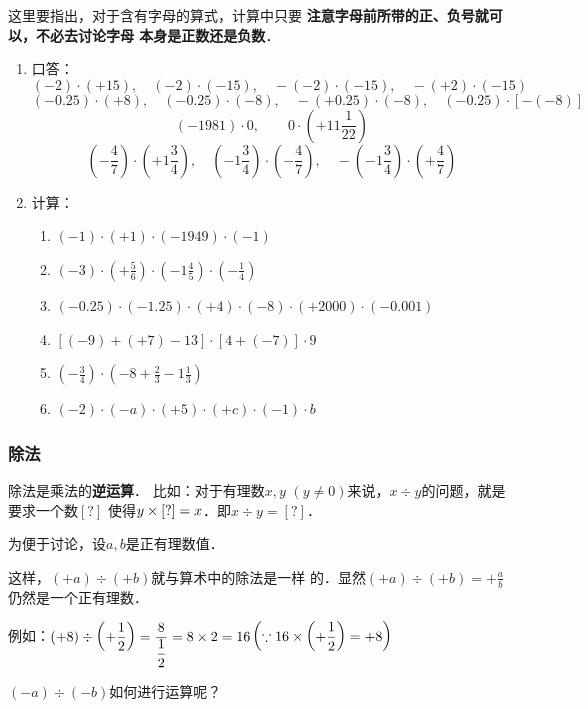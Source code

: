这里要指出，对于含有字母的算式，计算中只要
\textbf{注意字母前所带的正、负号就可以，不必去讨论字母
本身是正数还是负数}．

\begin{ex}
	\begin{enumerate}
		\item 口答：
		\[(-2)\cdot (+15),\quad (-2)\cdot (-15),\quad -(-2)\cdot (-15),\quad -(+2)\cdot (-15)\]
		\[(-0.25)\cdot (+8),\quad (-0.25)\cdot (-8),\quad -(+0.25)\cdot (-8),\quad(-0.25)\cdot [-(-8)] \]
		\[(-1981)\cdot 0,\qquad 0\cdot\left(+11\frac{1}{22}\right)\]
		\[\left(-\frac{4}{7}\right)\cdot \left(+1\frac{3}{4}\right),\quad \left(-1\frac{3}{4}\right)\cdot\left(-\frac{4}{7}\right),\quad -\left(-1\frac{3}{4}\right)\cdot\left(+\frac{4}{7}\right)\]
		
		\item 计算：
		\begin{enumerate}
			\item $(-1)\cdot(+1)\cdot (-1949)\cdot (-1)$
			\item $(-3)\cdot \left(+\frac{5}{6}\right)\cdot \left(-1\frac{4}{5}\right)\cdot\left(-\frac{1}{4}\right)$
			\item $(-0.25)\cdot (-1.25)\cdot (+4)\cdot (-8)\cdot (+2000)\cdot (-0.001)$
			\item $[(-9)+(+7)-13]\cdot [4+(-7)]\cdot 9$
			\item $\left(-\frac{3}{4}\right)\cdot \left(-8+\frac{2}{3}-1\frac{1}{3}\right)$
			\item $(-2)\cdot (-a)\cdot (+5)\cdot (+c)\cdot (-1)\cdot b$
		\end{enumerate}
	\end{enumerate}    
\end{ex}

\subsubsection{除法}
除法是乘法的\textbf{逆运算}． 比如：对于有理数$x,  y$
$(y\ne 0)$来说，$x\div y$的问题，就是要求一个数$[?]$
使得$y\times[?]=x$．即$x\div y=[?]$．

为便于讨论，设$a,b$是正有理数值．

这样，$(+a) \div (+b)$就与算术中的除法是一样
的．显然$(+a)\div (+b)=+\frac{a}{b}$仍然是一个正有理数．

例如：$(+8)\div\left(+\dfrac{1}{2}\right)=\dfrac{8}{\dfrac{1}{2}}=8\times 2=16$\quad $\left(\because 16\times\left(+\dfrac{1}{2}\right)=+8\right)$

$(-a) \div (-b)$如何进行运算呢？


